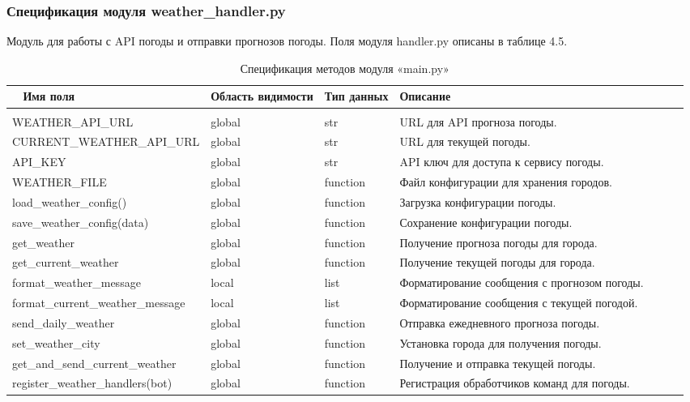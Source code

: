 \subsubsection{Спецификация модуля weather\_handler.py}
Модуль для работы с API погоды и отправки прогнозов погоды. Поля модуля handler.py описаны в таблице 4.5.
\begin{xltabular}{\textwidth}{|p{5cm}|p{2cm}|p{2cm}|X|}
	\caption{Спецификация методов модуля «main.py»\label{news5:table}}\ \hline
	\centrow Имя поля  & \centrow Область видимости & \centrow Тип данных &\centrow Описание \ \hline
	 &  &  &  \\ \hline
	\endfirsthead
	 &  &  &  \\ \hline
	\finishhead

WEATHER\_API\_URL & global& str & URL для API прогноза погоды. \\ \hline
CURRENT\_WEATHER\-\_API\_URL & global& str & URL для текущей погоды. \\ \hline
API\_KEY & global& str & API ключ для доступа к сервису погоды. \\ \hline
WEATHER\_FILE & global& function & Файл конфигурации для хранения городов. \\ \hline
load\_weather\_config() & global& function & Загрузка конфигурации погоды. \\ \hline
save\_weather\_config(data) & global& function & Сохранение конфигурации погоды. \\ \hline
get\_weather & global& function & Получение прогноза погоды для города. \\ \hline
get\_current\_weather & global& function & Получение текущей погоды для города. \\ \hline
format\_weather\_message & local& list & Форматирование сообщения с прогнозом погоды. \\ \hline
format\_current\-\_weather\_message & local & list & Форматирование сообщения с текущей погодой. \\ \hline
send\_daily\_weather & global& function & Отправка ежедневного прогноза погоды. \\ \hline
set\_weather\_city & global& function & Установка города для получения погоды. \\ \hline
get\_and\_send\-\_current\_weather & global& function & Получение и отправка текущей погоды. \\ \hline
register\_weather\-\_handlers(bot) & global & function & Регистрация обработчиков команд для погоды. \\ \hline
\end{xltabular}

